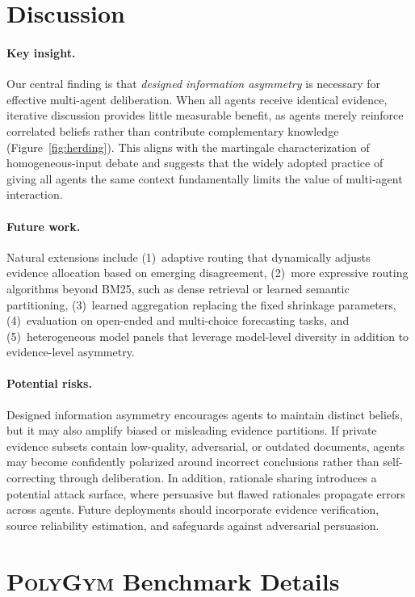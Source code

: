 \section{Discussion}

\paragraph{Key insight.}
Our central finding is that \textit{designed information asymmetry} is necessary for effective multi-agent deliberation.
When all agents receive identical evidence, iterative discussion provides little measurable benefit, as agents merely reinforce correlated beliefs rather than contribute complementary knowledge (Figure~\ref{fig:herding}).
This aligns with the martingale characterization of homogeneous-input debate and suggests that the widely adopted practice of giving all agents the same context fundamentally limits the value of multi-agent interaction.

\paragraph{Future work.}
Natural extensions include (1)~adaptive routing that dynamically adjusts evidence allocation based on emerging disagreement, (2)~more expressive routing algorithms beyond BM25, such as dense retrieval or learned semantic partitioning, (3)~learned aggregation replacing the fixed shrinkage parameters, (4)~evaluation on open-ended and multi-choice forecasting tasks, and (5)~heterogeneous model panels that leverage model-level diversity in addition to evidence-level asymmetry.

\paragraph{Potential risks.}
Designed information asymmetry encourages agents to maintain distinct beliefs, but it may also amplify biased or misleading evidence partitions. If private evidence subsets contain low-quality, adversarial, or outdated documents, agents may become confidently polarized around incorrect conclusions rather than self-correcting through deliberation. In addition, rationale sharing introduces a potential attack surface, where persuasive but flawed rationales propagate errors across agents. Future deployments should incorporate evidence verification, source reliability estimation, and safeguards against adversarial persuasion.

\section{\textsc{PolyGym} Benchmark Details}
\label{sec:appendix_dataset}

